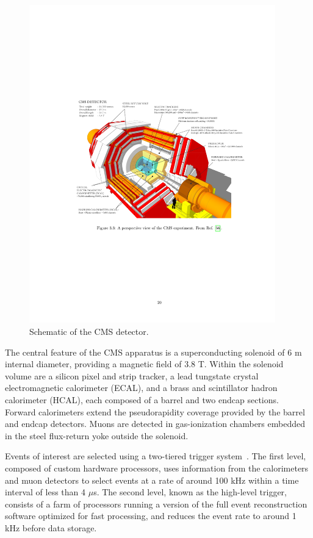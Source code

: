 \begin{figure}[hb]
\centering
\includegraphics[width=0.95\textwidth]{figures/cms_detector.pdf}
\caption{Schematic of the CMS detector.}
\label{fig:cmsdetector}
\end{figure}

The central feature of the CMS apparatus is a superconducting solenoid of 6 m internal diameter, providing a magnetic field of 3.8 T.
Within the solenoid volume are a silicon pixel and strip tracker, a lead tungstate crystal electromagnetic calorimeter (ECAL), and a brass and scintillator hadron calorimeter (HCAL), each composed of a barrel and two endcap sections. 
Forward calorimeters extend the pseudorapidity coverage provided by the barrel and endcap detectors. 
Muons are detected in gas-ionization chambers embedded in the steel flux-return yoke outside the solenoid.

Events of interest are selected using a two-tiered trigger system~\cite{Khachatryan:2016bia}.
The first level, composed of custom hardware processors, uses information from the calorimeters and muon detectors to select events at a rate of around 100 kHz within a time interval of less than 4 $\mu$s.
The second level, known as the high-level trigger, consists of a farm of processors running a version of the full event reconstruction software optimized for fast processing, and reduces the event rate to around 1 kHz before data storage.

